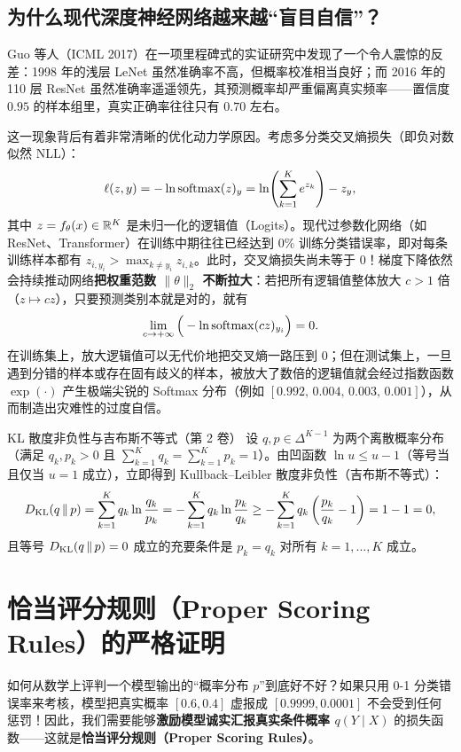 \subsection{为什么现代深度神经网络越来越“盲目自信”？}

Guo 等人（ICML 2017）在一项里程碑式的实证研究中发现了一个令人震惊的反差：1998 年的浅层 LeNet 虽然准确率不高，但概率校准相当良好；而 2016 年的 110 层 ResNet 虽然准确率遥遥领先，其预测概率却严重偏离真实频率——置信度 $0.95$ 的样本组里，真实正确率往往只有 $0.70$ 左右。

这一现象背后有着非常清晰的优化动力学原因。考虑多分类交叉熵损失（即负对数似然 NLL）：
\[
  \ell(z, y) = -\ln \operatorname{softmax}(z)_y = \ln\!\left(\sum_{k=1}^K e^{z_k}\right) - z_y,
\]
其中 $z = f_\theta(x) \in \mathbb{R}^K$ 是未归一化的逻辑值（Logits）。现代过参数化网络（如 ResNet、Transformer）在训练中期往往已经达到 $0\%$ 训练分类错误率，即对每条训练样本都有 $z_{i,y_i} > \max_{k\neq y_i} z_{i,k}$。此时，交叉熵损失尚未等于 $0$！梯度下降依然会持续推动网络\textbf{把权重范数 $\|\theta\|_2$ 不断拉大}：若把所有逻辑值整体放大 $c > 1$ 倍（$z \mapsto c z$），只要预测类别本就是对的，就有
\[
  \lim_{c\to +\infty} \Big(-\ln \operatorname{softmax}(c z)_{y_i}\Big) = 0.
\]
在训练集上，放大逻辑值可以无代价地把交叉熵一路压到 $0$；但在测试集上，一旦遇到分错的样本或存在固有歧义的样本，被放大了数倍的逻辑值就会经过指数函数 $\exp(\cdot)$ 产生极端尖锐的 Softmax 分布（例如 $[0.992,\, 0.004,\, 0.003,\, 0.001]$），从而制造出灾难性的过度自信。

\begin{recallBox}{KL 散度非负性与吉布斯不等式（第 2 卷）}
设 $q, p \in \Delta^{K-1}$ 为两个离散概率分布（满足 $q_k, p_k > 0$ 且 $\sum_{k=1}^K q_k = \sum_{k=1}^K p_k = 1$）。由凹函数 $\ln u \le u - 1$（等号当且仅当 $u=1$ 成立），立即得到 Kullback--Leibler 散度非负性（吉布斯不等式）：
\[
  D_{\mathrm{KL}}(q \,\|\, p) = \sum_{k=1}^K q_k \ln \frac{q_k}{p_k}
  = -\sum_{k=1}^K q_k \ln \frac{p_k}{q_k}
  \ge -\sum_{k=1}^K q_k \left(\frac{p_k}{q_k} - 1\right) = 1 - 1 = 0,
\]
且等号 $D_{\mathrm{KL}}(q \,\|\, p) = 0$ 成立的充要条件是 $p_k = q_k$ 对所有 $k=1,\dots,K$ 成立。
\end{recallBox}

\section{恰当评分规则（Proper Scoring Rules）的严格证明}

如何从数学上评判一个模型输出的“概率分布 $p$”到底好不好？如果只用 0-1 分类错误率来考核，模型把真实概率 $[0.6, 0.4]$ 虚报成 $[0.9999, 0.0001]$ 不会受到任何惩罚！因此，我们需要能够\textbf{激励模型诚实汇报真实条件概率 $q(Y \mid X)$} 的损失函数——这就是\textbf{恰当评分规则（Proper Scoring Rules）}。

